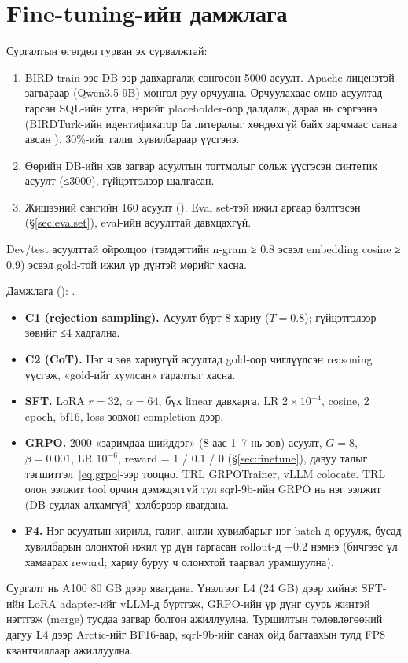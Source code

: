 \section{Fine-tuning-ийн дамжлага}
\label{sec:ft-pipeline}

Сургалтын өгөгдөл гурван эх сурвалжтай:
\begin{enumerate}
  \item BIRD train-ээс DB-ээр давхаргалж сонгосон 5000 асуулт. Apache лицензтэй загвараар (Qwen3.5-9B) монгол руу
        орчуулна. Орчуулахаас өмнө асуултад гарсан SQL-ийн утга, нэрийг placeholder-оор далдалж, дараа нь сэргээнэ
        (BIRDTurk-ийн идентификатор ба литералыг хөндөхгүй байх зарчмаас санаа авсан \cite{aktas_2026_birdturk}).
        30\%-ийг галиг хувилбараар үүсгэнэ.
  \item Өөрийн DB-ийн хэв загвар асуултын тогтмолыг сольж үүсгэсэн синтетик асуулт (≤3000), гүйцэтгэлээр шалгасан.
  \item Жишээний сангийн 160 асуулт (). Eval set-тэй ижил аргаар бэлтгэсэн
        (§\ref{sec:evalset}), eval-ийн асуулттай давхцахгүй.
\end{enumerate}
Dev/test асуулттай ойролцоо (тэмдэгтийн n-gram ≥ 0.8 эсвэл embedding cosine ≥ 0.9) эсвэл gold-той ижил үр дүнтэй
мөрийг хасна.

Дамжлага (): .
\begin{itemize}
  \item \textbf{C1 (rejection sampling).} Асуулт бүрт 8 хариу ($T = 0.8$); гүйцэтгэлээр зөвийг ≤4 хадгална.
  \item \textbf{C2 (CoT).} Нэг ч зөв хариугүй асуултад gold-оор чиглүүлсэн reasoning үүсгэж, «gold-ийг хуулсан» гаралтыг хасна.
  \item \textbf{SFT.} LoRA $r = 32$, $\alpha = 64$, бүх linear давхарга, LR $2\times10^{-4}$, cosine, 2 epoch,
        bf16, loss зөвхөн completion дээр.
  \item \textbf{GRPO.} 2000 «заримдаа шийддэг» (8-аас 1--7 нь зөв) асуулт, $G = 8$, $\beta = 0.001$, LR $10^{-6}$,
        reward = 1 / 0.1 / 0 (§\ref{sec:finetune}), давуу талыг тэгшитгэл~\ref{eq:grpo}-ээр тооцно. TRL GRPOTrainer,
        vLLM colocate. TRL олон ээлжит tool орчин дэмждэггүй тул sqrl-9b-ийн GRPO нь нэг ээлжит (DB судлах алхамгүй)
        хэлбэрээр явагдана.
  \item \textbf{F4.} Нэг асуултын кирилл, галиг, англи хувилбарыг нэг batch-д оруулж, бусад хувилбарын олонхтой ижил
        үр дүн гаргасан rollout-д +0.2 нэмнэ (бичгээс үл хамаарах reward; хариу буруу ч олонхтой таарвал урамшуулна).
\end{itemize}
Сургалт нь A100 80 GB дээр явагдана. Үнэлгээг L4 (24 GB) дээр хийнэ: SFT-ийн LoRA adapter-ийг vLLM-д бүртгэж,
GRPO-ийн үр дүнг суурь жинтэй нэгтгэж (merge) тусдаа загвар болгон ажиллуулна. Туршилтын төлөвлөгөөний дагуу L4 дээр
Arctic-ийг BF16-аар, sqrl-9b-ийг санах ойд багтаахын тулд FP8 квантчиллаар ажиллуулна.

